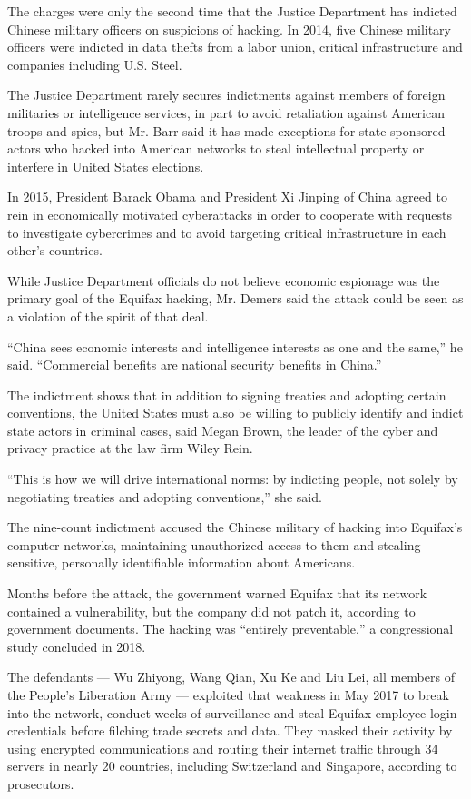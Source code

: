 The charges were only the second time that the Justice Department has
indicted Chinese military officers on suspicions of hacking. In 2014,
five Chinese military officers were indicted in data thefts from a labor
union, critical infrastructure and companies including U.S. Steel.

The Justice Department rarely secures indictments against members of
foreign militaries or intelligence services, in part to avoid
retaliation against American troops and spies, but Mr. Barr said it has
made exceptions for state-sponsored actors who hacked into American
networks to steal intellectual property or interfere in United States
elections.

In 2015, President Barack Obama and President Xi Jinping of China agreed
to rein in economically motivated cyberattacks in order to cooperate
with requests to investigate cybercrimes and to avoid targeting critical
infrastructure in each other's countries.

While Justice Department officials do not believe economic espionage was
the primary goal of the Equifax hacking, Mr. Demers said the attack
could be seen as a violation of the spirit of that deal.

``China sees economic interests and intelligence interests as one and
the same,'' he said. ``Commercial benefits are national security
benefits in China.''

The indictment shows that in addition to signing treaties and adopting
certain conventions, the United States must also be willing to publicly
identify and indict state actors in criminal cases, said Megan Brown,
the leader of the cyber and privacy practice at the law firm Wiley Rein.

``This is how we will drive international norms: by indicting people,
not solely by negotiating treaties and adopting conventions,'' she said.

The nine-count indictment accused the Chinese military of hacking into
Equifax's computer networks, maintaining unauthorized access to them and
stealing sensitive, personally identifiable information about Americans.

Months before the attack, the government warned Equifax that its network
contained a vulnerability, but the company did not patch it, according
to government documents. The hacking was ``entirely preventable,'' a
congressional study concluded in 2018.

The defendants --- Wu Zhiyong, Wang Qian, Xu Ke and Liu Lei, all members
of the People's Liberation Army --- exploited that weakness in May 2017
to break into the network, conduct weeks of surveillance and steal
Equifax employee login credentials before filching trade secrets and
data. They masked their activity by using encrypted communications and
routing their internet traffic through 34 servers in nearly 20
countries, including Switzerland and Singapore, according to
prosecutors.

